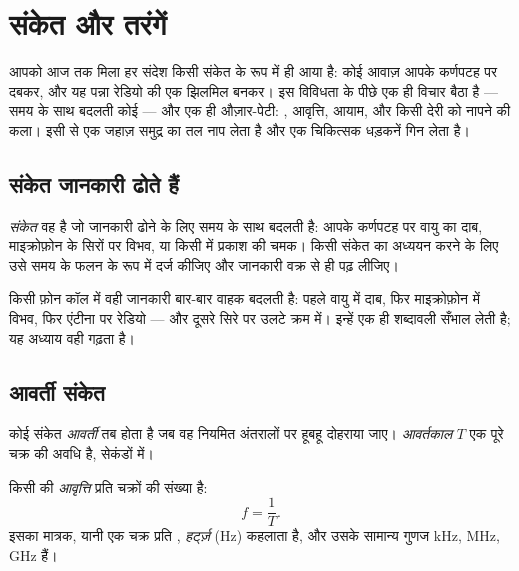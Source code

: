 \chapter{संकेत और तरंगें}\label{ch:g10:signals-and-waves}

आपको आज तक मिला हर संदेश किसी संकेत के रूप में ही आया है: कोई
आवाज़ आपके कर्णपटह पर दबकर, और यह पन्ना रेडियो की एक झिलमिल बनकर। इस
विविधता के पीछे एक ही विचार बैठा है --- समय के साथ बदलती कोई
 --- और एक ही औज़ार-पेटी: ,
आवृत्ति, आयाम, और किसी देरी को नापने की कला। इसी से एक
जहाज़ समुद्र का तल नाप लेता है और एक चिकित्सक धड़कनें गिन लेता है।

\section{संकेत जानकारी ढोते हैं}

\begin{definition}[संकेत]\label{def:g10:signals-and-waves:signal}
\emph{संकेत} वह  है जो जानकारी ढोने के लिए
समय के साथ बदलती है: आपके कर्णपटह पर वायु का दाब, माइक्रोफ़ोन के
सिरों पर विभव, या किसी  में प्रकाश की चमक। किसी संकेत
का अध्ययन करने के लिए उसे समय के फलन के रूप में दर्ज कीजिए और जानकारी
वक्र से ही पढ़ लीजिए।
\end{definition}

किसी फ़ोन कॉल में वही जानकारी बार-बार वाहक बदलती है: पहले वायु में
दाब, फिर माइक्रोफ़ोन में विभव, फिर एंटीना पर रेडियो --- और दूसरे
सिरे पर उलटे क्रम में। इन्हें एक ही शब्दावली सँभाल लेती है; यह अध्याय
वही गढ़ता है।

\section{आवर्ती संकेत}

\begin{definition}\label{def:g10:signals-and-waves:period}
कोई संकेत \emph{आवर्ती} तब होता है जब वह
नियमित अंतरालों पर हूबहू दोहराया जाए। \emph{आवर्तकाल}
$T$ एक पूरे चक्र की अवधि है, सेकंडों में।
\end{definition}

\begin{definition}[आवृत्ति]\label{def:g10:signals-and-waves:frequency}
किसी  की \emph{आवृत्ति} प्रति 
चक्रों की संख्या है:
\[
f = \frac{1}{T} .
\]
इसका मात्रक, यानी एक चक्र प्रति ,
\emph{हर्ट्ज़} (\unit{Hz}) कहलाता है, और उसके सामान्य गुणज
\unit{kHz}, \unit{MHz}, \unit{GHz} हैं।
\end{definition}

